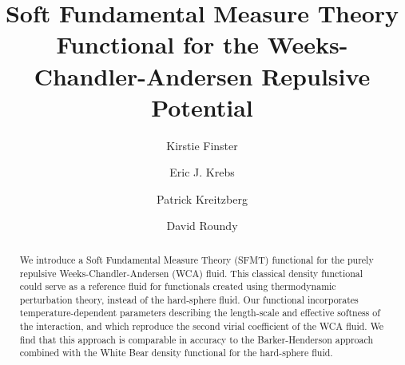 \documentclass[letterpaper,twocolumn,amsmath,amssymb,prb]{revtex4-1}
\newcommand\kirstiesays[1]{{\bf \color{red}K: #1}}
\begin{document}
\title{Soft Fundamental Measure Theory Functional for the
  Weeks-Chandler-Andersen Repulsive Potential}
  
\author{Kirstie Finster}

\author{Eric J. Krebs}

\author{Patrick Kreitzberg}

\author{David Roundy}

\begin{abstract}
  We introduce a Soft Fundamental Measure Theory (SFMT) functional
  for the purely repulsive Weeks-Chandler-Andersen (WCA) fluid.  This
  classical density functional could serve as a reference fluid for
  functionals created using thermodynamic perturbation theory, instead
  of the hard-sphere fluid.
  Our functional incorporates temperature-dependent parameters describing
  the length-scale and effective softness of the interaction,
  and which reproduce the second virial coefficient of the WCA fluid.
  We find that this approach is comparable in accuracy to the
  Barker-Henderson approach combined with the White
  Bear density functional for the hard-sphere fluid.
\end{abstract}

\maketitle



\end{document}
